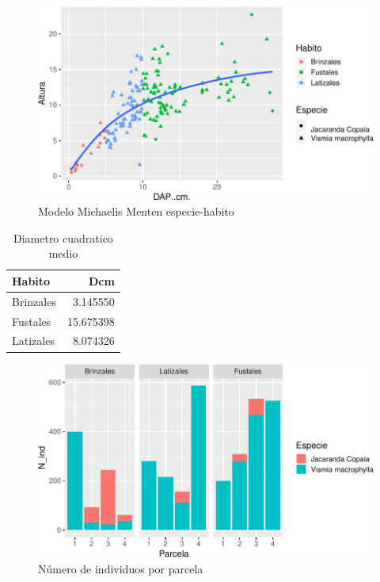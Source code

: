 \documentclass[letterpaper,9pt,twocolumn,twoside,]{pinp}
\begin{document}
\begin{figure}

{\centering \includegraphics{report_ecology_files/figure-latex/unnamed-chunk-7-1} 

}

\caption{Modelo Michaelis Menten especie-habito}\label{fig:unnamed-chunk-7}
\end{figure}

\begin{table}

\caption{\label{tab:unnamed-chunk-8}Diametro cuadratico medio}
\centering
\begin{tabular}[t]{l|r}
\hline
Habito & Dcm\\
\hline
Brinzales & 3.145550\\
\hline
Fustales & 15.675398\\
\hline
Latizales & 8.074326\\
\hline
\end{tabular}
\end{table}

\begin{figure}

{\centering \includegraphics{report_ecology_files/figure-latex/unnamed-chunk-10-1} 

}

\caption{Número de individuos por parcela}\label{fig:unnamed-chunk-10}
\end{figure}
\end{document}
